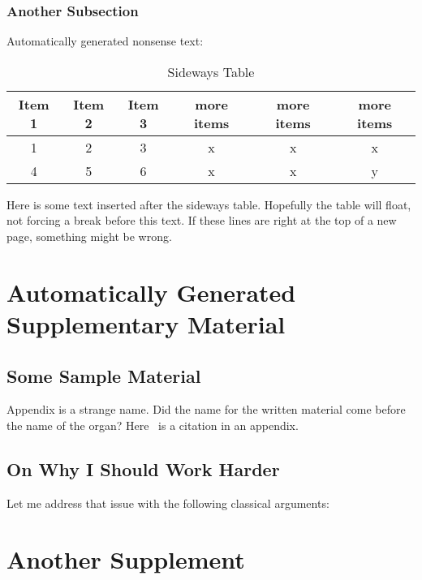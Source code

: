 \documentclass[draft, masters]{csuthesis} %
\begin{document}
\subsection{Another Subsection}

Automatically generated nonsense text: \lipsum[3-4]

\begin{sidewayspage}
\begin{table}[h]
\caption{Sideways Table \label{table:sidetable}}
\begin{tabular}{|c|c|c|ccc|}
\hline
Item 1 & Item 2 & Item 3 & more items & more items & more items\\
\hline
\hline
1 & 2 & 3 & x & x & x\\
4 & 5 & 6 & x & x & y\\
\hline
\end{tabular}
\end{table}
\end{sidewayspage}

Here is some text inserted after the sideways table.  Hopefully the table will float, not forcing a break before this text.  If these lines are right at the top of a new page, something might be wrong. \lipsum[1-3]

\backmatter


\appendix %

% 
\chapter{Automatically Generated Supplementary Material} %

\section{Some Sample Material}

Appendix is a strange name.  Did the name for the written material come before the name of the organ? Here~\cite{infodim} is a citation in an appendix.

\lipsum[5-7]

\section{On Why I Should Work Harder}

Let me address that issue with the following classical arguments: \lipsum[1-2]

\chapter{Another Supplement}

\lipsum[1-3]
\end{document}
